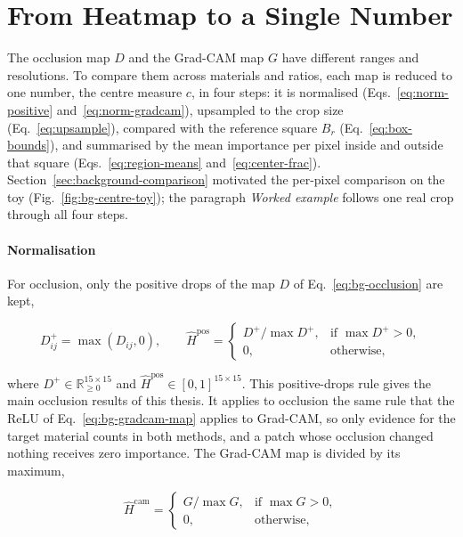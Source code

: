 \section{From Heatmap to a Single Number}
\label{sec:methodology-reduction}

The occlusion map $D$ and the Grad-CAM map $G$ have different ranges and resolutions.
To compare them across materials and ratios, each map is reduced to one number, the
centre measure $c$, in four steps: it is normalised
(Eqs.~\eqref{eq:norm-positive} and~\eqref{eq:norm-gradcam}), upsampled to the crop size
(Eq.~\eqref{eq:upsample}), compared with the reference square $B_r$
(Eq.~\eqref{eq:box-bounds}), and summarised by the mean importance per pixel inside and
outside that square (Eqs.~\eqref{eq:region-means} and~\eqref{eq:center-frac}).
Section~\ref{sec:background-comparison} motivated the per-pixel comparison on the toy
(Fig.~\ref{fig:bg-centre-toy}); the paragraph \emph{Worked example} follows one real
crop through all four steps.

\paragraph{Normalisation}
\label{sec:methodology-normalisation}
For occlusion, only the positive drops of the map $D$ of Eq.~\eqref{eq:bg-occlusion}
are kept,

\begin{equation}
D^+_{ij} = \max(D_{ij}, 0), \qquad
\hat{H}^{\mathrm{pos}} =
\begin{cases}
D^+ / \max D^+, & \text{if } \max D^+ > 0,\\
0, & \text{otherwise,}
\end{cases}
\label{eq:norm-positive}
\end{equation}

where $D^+ \in \mathbb{R}_{\ge 0}^{15 \times 15}$ and
$\hat{H}^{\mathrm{pos}} \in [0,1]^{15 \times 15}$. This positive-drops rule gives the
main occlusion results of this thesis. It applies to occlusion the same rule that the
ReLU of Eq.~\eqref{eq:bg-gradcam-map} applies to Grad-CAM, so only evidence for the
target material counts in both methods, and a patch whose occlusion changed nothing
receives zero importance. The Grad-CAM map is divided by its maximum,

\begin{equation}
\hat{H}^{\mathrm{cam}} =
\begin{cases}
G / \max G, & \text{if } \max G > 0,\\
0, & \text{otherwise,}
\end{cases}
\label{eq:norm-gradcam}
\end{equation}

